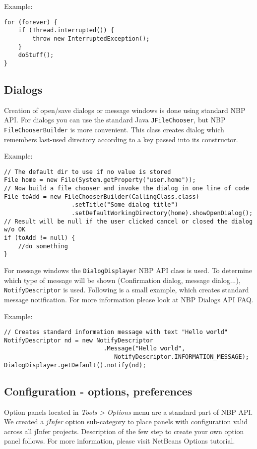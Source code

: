 \documentclass[a4paper,10pt,oneside]{article}
\begin{document}
Example:
\begin{verbatim}
for (forever) {
    if (Thread.interrupted()) {
        throw new InterruptedException();
    }
    doStuff();
}
\end{verbatim}
\subsection*{Dialogs}
\par 
  Creation of open/save dialogs or message windows is done using standard NBP API.
  For dialogs you can use the standard Java \texttt{JFileChooser},
  but NBP \texttt{FileChooserBuilder}
  is more convenient. This class creates dialog which remembers last-used
  directory according to a key passed into its constructor.

Example:
\begin{verbatim}
// The default dir to use if no value is stored
File home = new File(System.getProperty("user.home"));
// Now build a file chooser and invoke the dialog in one line of code
File toAdd = new FileChooserBuilder(CallingClass.class)
                   .setTitle("Some dialog title")
                   .setDefaultWorkingDirectory(home).showOpenDialog();
// Result will be null if the user clicked cancel or closed the dialog w/o OK
if (toAdd != null) {
    //do something
}
\end{verbatim}
\par 
  For message windows the \texttt{DialogDisplayer} NBP API
  class is used. To determine which type of message will be shown
  (Confirmation dialog, message dialog...),
  \texttt{NotifyDescriptor}
  is used. Following is a small example, which creates standard message
  notification. For more information please look at
  NBP Dialogs API FAQ.

Example:
\begin{verbatim}
// Creates standard information message with text "Hello world"
NotifyDescriptor nd = new NotifyDescriptor
                            .Message("Hello world",
                               NotifyDescriptor.INFORMATION_MESSAGE);
DialogDisplayer.getDefault().notify(nd);
\end{verbatim}
\subsection*{Configuration - options, preferences}
\par 
  Option panels located in \textit{Tools > Options} menu are a standard part of
  NBP API. We created a \textit{jInfer} option sub-category to place panels with
  configuration valid across all jInfer projects. Description of the few step
  to create your own option panel follows. For more information, please visit
  NetBeans Options tutorial.
\end{document}
